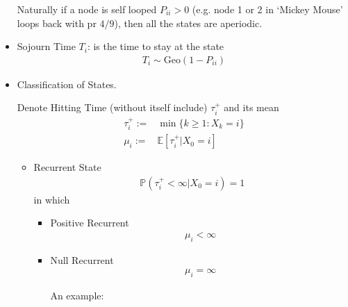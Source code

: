 \begin{itemize}[topsep=2pt,itemsep=0pt]
        Naturally if a node is self looped $ P_{ii}>0 $ (e.g. node 1 or 2 in `Mickey Mouse' loops back with pr $ 4/9 $), then all the states are aperiodic.
        \item Sojourn Time $ T_i $: is the time to stay at the state
        \begin{align}\label{EqaDTMCSojournTime}
            T_i\sim \mathrm{Geo}(1-P_{ii})  
        \end{align}
        \item Classification of States. 
        
        Denote Hitting Time (without itself include) $ \tau_i^+ $ and its mean 
        \begin{align}
            \tau_i^+:=&\min\{k\geq 1:X_k=i\}\\
            \mu _i:=&\mathbb{E}\left[ \tau_i^+|X_0=i \right] 
        \end{align}
        
        \begin{itemize}[topsep=2pt,itemsep=0pt]
            \item Recurrent State
            \begin{align}
                \mathbb{P}\left( \tau_i^+<\infty|X_0=i    \right)=1  
            \end{align}
            in which 
            \begin{itemize}[topsep=2pt,itemsep=0pt]
                \item Positive Recurrent
                \begin{align}
                    \mu _i<\infty 
                \end{align}
                \item Null Recurrent
                \begin{align}
                    \mu _i=\infty 
                \end{align}

                An example:
                \begin{center}
\end{center}
\end{itemize}
\end{itemize}
\end{itemize}
